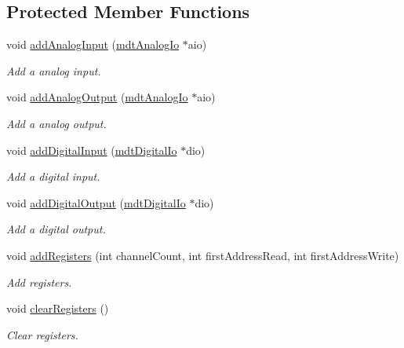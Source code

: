\subsection*{Protected Member Functions}
\begin{DoxyCompactItemize}
\item 
void \hyperlink{classmdt_device_modbus_wago_module_aec3bf9299744d0263339d7d419955154}{addAnalogInput} (\hyperlink{classmdt_analog_io}{mdtAnalogIo} $\ast$aio)
\begin{DoxyCompactList}\small\item\em Add a analog input. \end{DoxyCompactList}\item 
void \hyperlink{classmdt_device_modbus_wago_module_a382ba4bf293bce7c63ee861aebb71b4e}{addAnalogOutput} (\hyperlink{classmdt_analog_io}{mdtAnalogIo} $\ast$aio)
\begin{DoxyCompactList}\small\item\em Add a analog output. \end{DoxyCompactList}\item 
void \hyperlink{classmdt_device_modbus_wago_module_aaca2ca0616e03c49bc84b3277ec79f4a}{addDigitalInput} (\hyperlink{classmdt_digital_io}{mdtDigitalIo} $\ast$dio)
\begin{DoxyCompactList}\small\item\em Add a digital input. \end{DoxyCompactList}\item 
void \hyperlink{classmdt_device_modbus_wago_module_a575536bfe7381d7c6ece4552923b0129}{addDigitalOutput} (\hyperlink{classmdt_digital_io}{mdtDigitalIo} $\ast$dio)
\begin{DoxyCompactList}\small\item\em Add a digital output. \end{DoxyCompactList}\item 
void \hyperlink{classmdt_device_modbus_wago_module_ad803f3aa8d9777feaa5cdb3a4cccd316}{addRegisters} (int channelCount, int firstAddressRead, int firstAddressWrite)
\begin{DoxyCompactList}\small\item\em Add registers. \end{DoxyCompactList}\item 
void \hyperlink{classmdt_device_modbus_wago_module_a4c972b61d55abfc249c02fbe7b3dbb9c}{clearRegisters} ()
\begin{DoxyCompactList}\small\item\em Clear registers. \end{DoxyCompactList}\item 

\end{DoxyCompactItemize}
